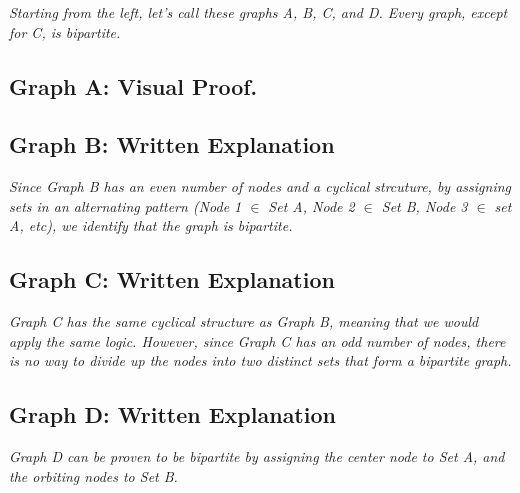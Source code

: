 \documentclass{article}
\begin{document}
\hspace{1cm}\textit{Starting from the left, let's call these graphs A, B, C, and D. Every graph, except for C, is bipartite.}
\subsection{Graph A: Visual Proof.}
\begin{center}
\end{center}

\subsection{Graph B: Written Explanation}
\hspace{1cm}\textit{Since Graph B has an even number of nodes and a cyclical 
    strcuture, by assigning sets in an alternating pattern (Node 1 $\in$ Set A,
    Node 2 $\in$ Set B, Node 3 $\in$ set A, etc), we identify that the graph is
    bipartite.}
\subsection{Graph C: Written Explanation}
\hspace{1cm}\textit{Graph C has the same cyclical structure as Graph B, meaning
    that we would apply the same logic. However, since Graph C has an odd number
    of nodes, there is no way to divide up the nodes into two distinct sets that 
    form a bipartite graph.}
\subsection{Graph D: Written Explanation}
\hspace{1cm}\textit{Graph D can be proven to be bipartite by assigning the center
    node to Set A, and the orbiting nodes to Set B.}
\end{document}
